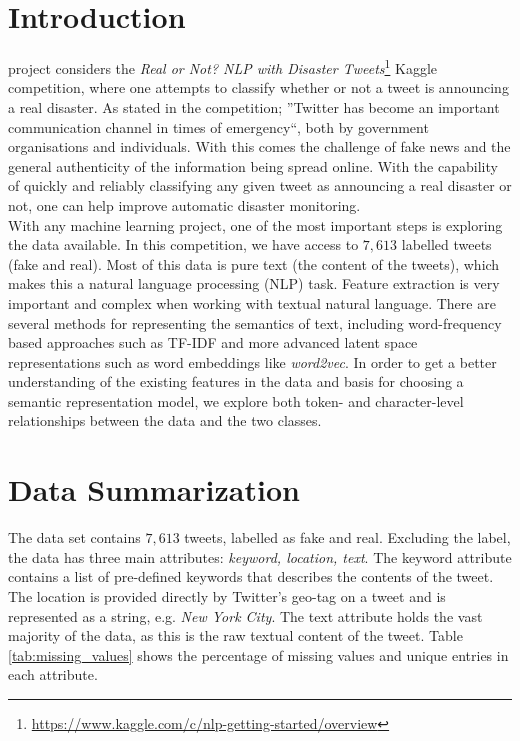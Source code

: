 \documentclass[journal, ]{IEEEtran}
\begin{document}
\section{Introduction}
 project considers the \textit{Real or Not? NLP
with Disaster
Tweets}\footnote{\url{https://www.kaggle.com/c/nlp-getting-started/overview}}
Kaggle competition, where one attempts to classify whether or not a tweet is
announcing a real disaster. As stated in the competition; ''Twitter has become
an important communication channel in times of emergency``, both by government
organisations and individuals. With this comes the challenge of fake news and
the general authenticity of the information being spread online. With the
capability of quickly and reliably classifying any given tweet as announcing a
real disaster or not, one can help improve automatic disaster monitoring.\\

With any machine learning project, one of the most important steps is exploring
the data available. In this competition, we have access to $7,613$ labelled
tweets (fake and real). Most of this data is pure text (the content of the
tweets), which makes this a natural language processing (NLP) task. Feature
extraction is very important and complex when working with textual natural
language. There are several methods for representing the semantics of text,
including word-frequency based approaches such as TF-IDF and more advanced
latent space representations such as word embeddings like
\textit{word2vec}\cite{mikolov2013}. In order to get a better understanding of
the existing features in the data and basis for choosing a semantic
representation model, we explore both token- and character-level relationships
between the data and the two classes.

\section{Data Summarization}
The data set contains $7,613$ tweets, labelled as fake and real. Excluding the
label, the data has three main attributes: \textit{keyword, location, text}.
The keyword attribute contains a list of pre-defined keywords that describes
the contents of the tweet. The location is provided directly by Twitter's
geo-tag on a tweet and is represented as a string, e.g. \textit{New York
City}. The text attribute holds the vast majority of the data, as this is the
raw textual content of the tweet. Table \ref{tab:missing_values} shows the
percentage of missing values and unique entries in each attribute. 
\end{document}
